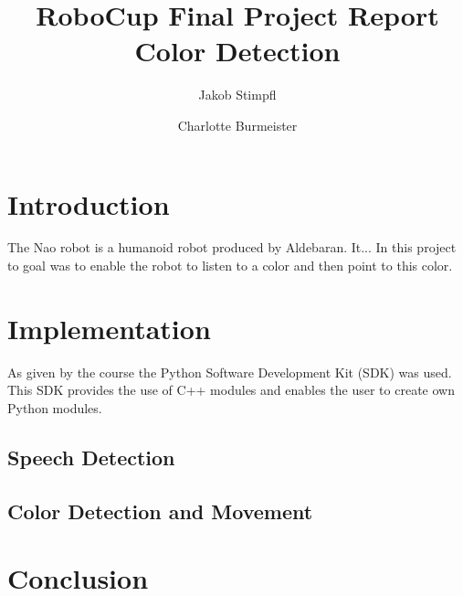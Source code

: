 \documentclass[a4paper]{article}
\title{RoboCup Final Project Report \\ Color Detection }
\author{Jakob Stimpfl \and Charlotte Burmeister}
\begin{document}
\maketitle
\tableofcontents




\section{Introduction}
The Nao robot is a humanoid robot produced by Aldebaran. It...
In this project to goal was to enable the robot to listen to a color and then point to this color.



\section{Implementation}

As given by the course the Python Software Development Kit (SDK) was used.
This SDK provides the use of C++ modules and enables the user to create own Python modules.\cite{API}

\subsection{Speech Detection}
\subsection{Color Detection and Movement}
\section{Conclusion}

\printbibliography
\end{document}
